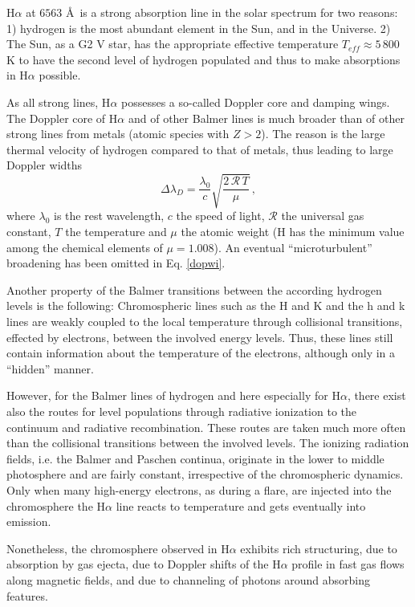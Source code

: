 H$\alpha$ at $6563$ \AA\, is a strong absorption line in the solar spectrum for two reasons: 1) hydrogen is the most abundant element in the Sun, and in the Universe. 2) The Sun, as a G2 $\mathrm{V}$ star, has the appropriate effective temperature $T_{eff}\approx5\,800$ K to have the second level of hydrogen populated and thus to make absorptions in H$\alpha$ possible. 

As all strong lines, H$\alpha$ possesses a so-called Doppler core and damping wings. The Doppler core of H$\alpha$ and of other Balmer lines is much broader than of other strong lines from metals (atomic species with $Z>2$). The reason is the large thermal velocity of hydrogen compared to that of metals, thus leading to large Doppler widths
\begin{equation}
\Delta\lambda_{D}=\frac{\lambda_{0}}{c}\sqrt{\frac{2\,\mathcal{R}\,T}{\mu}}\, ,
\label{dopwi}
\end{equation}
where $\lambda_{0}$ is the rest wavelength, $c$ the speed of light, $\mathcal{R}$
 the universal gas constant, $T$ the temperature and $\mu$ the atomic weight (H has the minimum value among the chemical elements of $\mu = 1.008$). An eventual ``microturbulent'' broadening has been omitted in Eq. \ref{dopwi}.
 
 Another property of the Balmer transitions between the according hydrogen levels is the following: Chromospheric lines such as the  H and K and the  h and k lines are weakly coupled to the local temperature through collisional transitions, effected by electrons, between the involved energy levels. Thus, these lines still contain information about the temperature of the electrons, although only in a ``hidden'' manner.
 
 However, for the Balmer lines of hydrogen and here especially for H$\alpha$, there exist also the routes for level populations through radiative ionization to the continuum and radiative recombination. These routes are taken much more often than the collisional transitions between the involved levels. The ionizing radiation fields, i.e. the Balmer and Paschen continua, originate in the lower to middle photosphere and are fairly constant, irrespective of the chromospheric dynamics. Only when many high-energy electrons, as during a flare, are injected into the chromosphere the H$\alpha$ line reacts to temperature and gets eventually into emission.
 
 Nonetheless, the chromosphere observed in H$\alpha$ exhibits rich structuring, due to absorption by gas ejecta, due to Doppler shifts of the H$\alpha$ profile in fast gas flows along magnetic fields, and due to channeling of photons around absorbing features.


